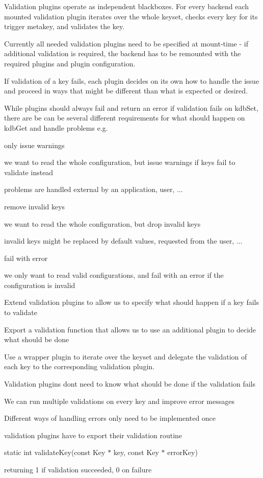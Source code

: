Validation plugins operate as independent blackboxes. For every backend each mounted validation plugin iterates over the whole keyset, checks every key for its trigger metakey, and validates the key.

Currently all needed validation plugins need to be specified at mount-\/time -\/ if additional validation is required, the backend has to be remounted with the required plugins and plugin configuration.

If validation of a key fails, each plugin decides on its own how to handle the issue and proceed in ways that might be different than what is expected or desired.

While plugins should always fail and return an error if validation fails on kdb\+Set, there are be can be several different requirements for what should happen on kdb\+Get and handle problems e.\+g.


\begin{DoxyItemize}
\item only issue warnings

we want to read the whole configuration, but issue warnings if keys fail to validate instead

problems are handled external by an application, user, ...
\item remove invalid keys

we want to read the whole configuration, but drop invalid keys

invalid keys might be replaced by default values, requested from the user, ...
\item fail with error

we only want to read valid configurations, and fail with an error if the configuration is invalid
\end{DoxyItemize}


\begin{DoxyItemize}
\item Extend validation plugins to allow us to specify what should happen if a key fails to validate
\item Export a validation function that allows us to use an additional plugin to decide what should be done
\end{DoxyItemize}

Use a wrapper plugin to iterate over the keyset and delegate the validation of each key to the corresponding validation plugin.


\begin{DoxyItemize}
\item Validation plugins don\textquotesingle{}t need to know what should be done if the validation fails
\item We can run multiple validations on every key and improve error messages
\item Different ways of handling errors only need to be implemented once
\end{DoxyItemize}

validation plugins have to export their validation routine

{\ttfamily static int validate\+Key(const Key $\ast$ key, const Key $\ast$ error\+Key)}

returning 1 if validation succeeded, 0 on failure